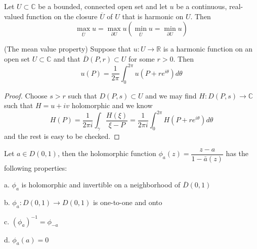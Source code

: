\documentclass[lang=en, color=blue, ]{elegantbook}
\newcommand{\R}{\mathbb{R}}
\newcommand{\C}{\mathbb{C}}
\begin{document}
\begin{corollary}
    Let $U\subset \C$ be a bounded, connected open set and let $u$ be a continuous, real-valued function on the closure $\overline{U}$ of $U$ that is harmonic on $U$. Then
    \[\max_{\overline{U}} u = \max_{\partial U} u(\min_{\overline{U}} u = \min_{\partial U} u)\]
\end{corollary}

\begin{theorem}
    (The mean value property) Suppose that $u:U\to\R$ is a harmonic function on an open set $U\subset\C$ and that $\overline{D}(P,r) \subset U$ for some $r>0$. Then
    \[u(P) = \dfrac{1}{2\pi} \int_0^{2\pi} u(P+re^{i\theta})d\theta\]
\end{theorem}
\begin{proof}
    Choose $s>r$ such that $D(P,s)\subset U$ and we may find $H:D(P,s) \to \C$ such that $H= u+iv$ holomorphic and we know
    \[H(P) = \dfrac{1}{2\pi i }\int_{\gamma}\dfrac{H(\xi)}{\xi-P} = \dfrac{1}{2\pi i}\int_0^{2\pi} H(P+re^{i\theta}) d\theta\]
    and the rest is easy to be checked.
\end{proof}

\begin{lemma}
    Let $a\in D(0,1)$, then the holomorphic function $\phi_a(z) = \dfrac{z-a}{1-\bar{a}(z)}$ has the following properties:\par
    a. $\phi_a$ is holomorphic and invertible on a neighborhood of $\overline{D}(0,1)$\par
    b. $\phi_a:D(0,1)\to D(0,1)$ is one-to-one and onto\par
    c. $(\phi_a)^{-1} = \phi_{-a}$\par
    d. $\phi_a(a) = 0$
\end{lemma}
\end{document}
